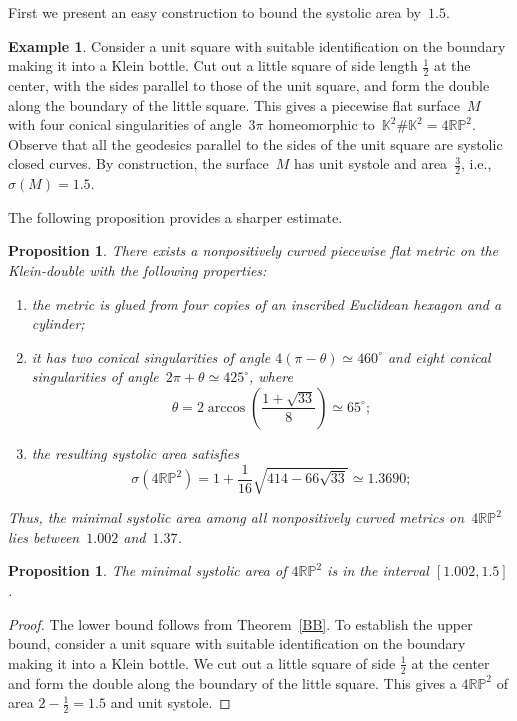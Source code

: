 \documentclass[12pt,reqno]{amsart}
\newtheorem{proposition}[theorem]{Proposition}
\theoremstyle{definition}
\newtheorem{example}[theorem]{Example}
\numberwithin{equation}{section}
\newcommand\K {{\mathbb K}}
\newcommand{\RP}{{\mathbb R\mathbb P}}
\numberwithin{equation}{section}
\begin{document}
\medskip

First we present an easy construction to bound the systolic area by~$1.5$.  

\begin{example}
Consider a unit square with suitable identification on the boundary
making it into a Klein bottle.  Cut out a little square of side length
$\frac{1}{2}$ at the center, with the sides parallel to those of the
unit square, and form the double along the boundary of the little
square.  This gives a piecewise flat surface~$M$ with four conical
singularities of angle~$3\pi$ homeomorphic to~$\K^2\#\K^2=4\RP^2$.
Observe that all the geodesics parallel to the sides of the unit
square are systolic closed curves.  By construction, the surface~$M$
has unit systole and area~$\frac{3}{2}$, i.e., $\sigma(M)=1.5$.
\end{example}

The following proposition provides a sharper estimate.


\begin{proposition}
\label{p51}  
There exists a nonpositively curved piecewise flat metric on the
Klein-double with the following properties:
\begin{enumerate}
\item
the metric is glued from four copies of an inscribed Euclidean
hexagon and a cylinder;
\item
it has  two conical singularities of angle $4(\pi- \theta)
\simeq 460^\circ$ and eight conical singularities of
angle~$2\pi+\theta \simeq 425^\circ$, where
\[
\theta = 2 \arccos\left(\frac{1+\sqrt{33}}{8}\right) \simeq 65^\circ;
\]
\item
the resulting systolic area satisfies
\[
\sigma(4\RP^2) = 1 + \frac{1}{16} \sqrt{414-66 \sqrt{33}}  \simeq
1.3690;
\]
\end{enumerate}

Thus, the minimal systolic area among all nonpositively curved metrics
on~$4\RP^2$ lies between~$1.002$ and~$1.37$.
\end{proposition}




\forget

\begin{proposition}
The minimal systolic area of $4\RP^2$ is in the interval
$[1.002,1.5]$.
\end{proposition}

\begin{proof}
The lower bound follows from Theorem~\ref{BB}.  To establish the upper
bound, consider a unit square with suitable identification on the
boundary making it into a Klein bottle.  We cut out a little square of
side $\frac12$ at the center and form the double along the boundary of
the little square.  This gives a $4\RP^2$ of area $2 - \frac12 = 1.5$
and unit systole.
\end{proof}
\end{document}
